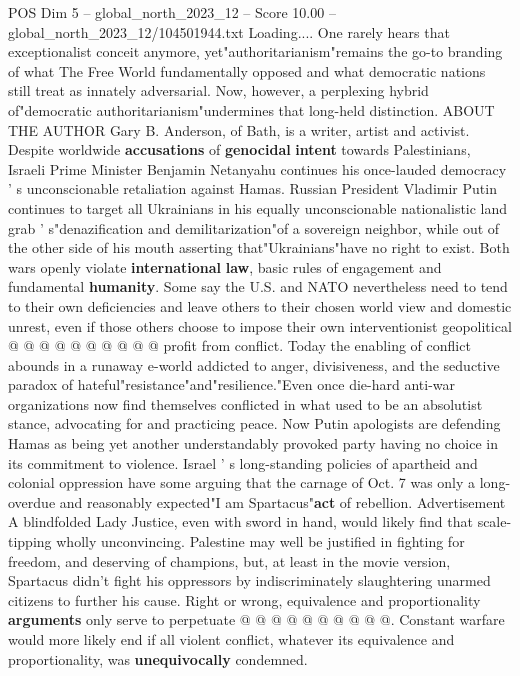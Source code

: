 \begin{textsample}{POS Dim 5 – global\_north\_2023\_12 – Score 10.00 – global\_north\_2023\_12/104501944.txt}  \label{ex:f5_pos_349}
Loading....
One rarely hears that exceptionalist conceit anymore, yet"authoritarianism"remains the go-to branding of what The Free World fundamentally opposed and what democratic nations still treat as innately adversarial.
Now, however, a perplexing hybrid of"democratic authoritarianism"undermines that long-held distinction.
ABOUT THE AUTHOR Gary B.
Anderson, of Bath, is a writer, artist and activist.
Despite worldwide \textbf{accusations} of \textbf{genocidal} \textbf{intent} towards Palestinians, Israeli Prime Minister Benjamin Netanyahu continues his once-lauded democracy ' s unconscionable retaliation against Hamas.
Russian President Vladimir Putin continues to target all Ukrainians in his equally unconscionable nationalistic land grab ' s"denazification and demilitarization"of a sovereign neighbor, while out of the other side of his mouth asserting that"Ukrainians"have no right to exist.
Both wars openly violate \textbf{international} \textbf{law}, basic rules of engagement and fundamental \textbf{humanity}.
Some say the U.S. and NATO nevertheless need to tend to their own deficiencies and leave others to their chosen world view and domestic unrest, even if those others choose to impose their own interventionist geopolitical @ @ @ @ @ @ @ @ @ @ profit from conflict.
Today the enabling of conflict abounds in a runaway e-world addicted to anger, divisiveness, and the seductive paradox of hateful"resistance"and"resilience."Even once die-hard anti-war organizations now find themselves conflicted in what used to be an absolutist stance, advocating for and practicing peace.
Now Putin apologists are defending Hamas as being yet another understandably provoked party having no choice in its commitment to violence.
Israel ' s long-standing policies of apartheid and colonial oppression have some arguing that the carnage of Oct. 7 was only a long-overdue and reasonably expected"I am Spartacus"\textbf{act} of rebellion.
Advertisement A blindfolded Lady Justice, even with sword in hand, would likely find that scale-tipping wholly unconvincing.
Palestine may well be justified in fighting for freedom, and deserving of champions, but, at least in the movie version, Spartacus didn't fight his oppressors by indiscriminately slaughtering unarmed citizens to further his cause.
Right or wrong, equivalence and proportionality \textbf{arguments} only serve to perpetuate @ @ @ @ @ @ @ @ @ @.
Constant warfare would more likely end if all violent conflict, whatever its equivalence and proportionality, was \textbf{unequivocally} condemned.

\end{textsample}
